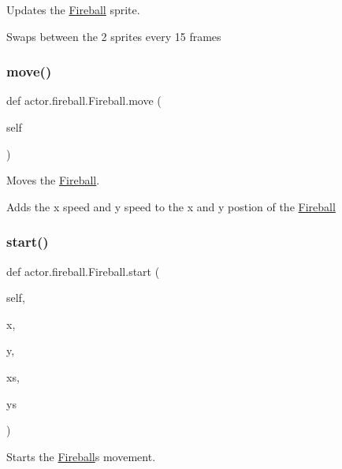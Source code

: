Updates the \hyperlink{classactor_1_1fireball_1_1_fireball}{Fireball} sprite. 

Swaps between the 2 sprites every 15 frames \mbox{\label{classactor_1_1fireball_1_1_fireball_a7eca2eb84a6f46f23df4a092edd044ac}} 
\subsubsection{\texorpdfstring{move()}{move()}}
{\footnotesize\ttfamily def actor.\+fireball.\+Fireball.\+move (\begin{DoxyParamCaption}\item[{}]{self }\end{DoxyParamCaption})}



Moves the \hyperlink{classactor_1_1fireball_1_1_fireball}{Fireball}. 

Adds the x speed and y speed to the x and y postion of the \hyperlink{classactor_1_1fireball_1_1_fireball}{Fireball} \mbox{\label{classactor_1_1fireball_1_1_fireball_a5a93196e521c8cca75aac1dc7f9080a4}} 
\subsubsection{\texorpdfstring{start()}{start()}}
{\footnotesize\ttfamily def actor.\+fireball.\+Fireball.\+start (\begin{DoxyParamCaption}\item[{}]{self,  }\item[{}]{x,  }\item[{}]{y,  }\item[{}]{xs,  }\item[{}]{ys }\end{DoxyParamCaption})}



Starts the \hyperlink{classactor_1_1fireball_1_1_fireball}{Fireball}\textquotesingle{}s movement. 

